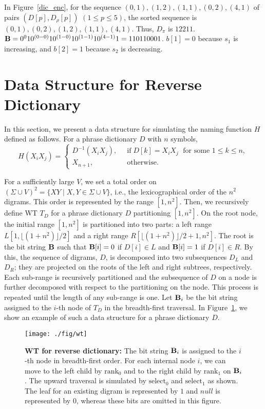 \documentclass[10pt]{llncs}
\begin{document}
In Figure~\ref{dic_enc}, for the sequence $(0,1),(1,2),(1,1),(0,2),(4,1)$ of pairs $(D[p],D_{\rho}[p])$ $(1\leq p \leq 5)$, 
the sorted sequence is $(0,1),(0,2),(1,2),(1,1),(4,1)$.
Thus, $D_\pi$ is $12211$. 
${\bf B}=0^010^{(0-0)}10^{(1-0)}10^{(1-1)}10^{(4-1)}1=110110001$.
$b[1]=0$ because $s_1$ is increasing, and $b[2]=1$ because $s_2$ is decreasing.

\section{Data Structure for Reverse Dictionary}

In this section, we present a data structure for simulating 
the naming function $H$ defined as follows.
For a phrase dictionary $D$ with $n$ symbols,
\[
H(X_iX_j)=\left\{
\begin{array}{ll}
D^{-1}(X_iX_j), & \;\; \mbox{if} \;D[k]=X_iX_j \;\mbox{ for some } 1\leq k\leq n, \\
X_{n+1}, & \;\; \mbox{otherwise.}
\end{array}
\right.
\]

For a sufficiently large $V$, 
we set a total order on $(\Sigma\cup V)^2=\{ XY \mid
X,Y\in \Sigma\cup V\}$, i.e., 
the lexicographical order of the $n^2$ digrams.
This order is represented by the range $[1,n^2]$.
Then, we recursively define WT $T_D$ for a phrase dictionary $D$ 
partitioning $[1,n^2]$.
On the root node, the initial range $[1,n^2]$ is partitioned into two parts: a left range
$L[1,\lfloor(1+n^2)\rfloor/2]$ and a right range $R[\lfloor(1+n^2)\rfloor/2+1,n^2]$.
The root is the bit string ${\bf B}$ such that
${\bf B}[i]=0$ if $D[i]\in L$ and ${\bf B}[i]=1$ if $D[i]\in R$.
By this, the sequence of digrams, $D$, is decomposed into two subsequences $D_L$ and $D_R$;
they are projected on the roots of the left and right subtrees, respectively.
Each sub-range is recursively partitioned and 
the subsequence of $D$ on a node is further decomposed
with respect to the partitioning on the node.
This process is repeated until the length of any sub-range is one.
Let ${\bf B}_i$ be the bit string assigned to the $i$-th node
of $T_D$ in the breadth-first traversal.
In Figure~\ref{wavelet_dic}, we show an example
of such a data structure for a phrase dictionary $D$.

\begin{figure}[tb]
\begin{center}
\texttt{[image: ./fig/wt]}
\end{center}
\caption{
{\bf WT for reverse dictionary:}
The bit string ${\bf B}_i$ is assigned to 
the $i$-th node in breadth-first order.
For each internal node $i$,
we can move to the left child by $\mbox{rank}_0$
and to the right child by $\mbox{rank}_1$ on ${\bf B}_i$.
The upward traversal is simulated by $\mbox{select}_0$
and $\mbox{select}_1$ as shown.
The leaf for an existing digram is represented by $1$
and $null$ is represented by $0$, whereas
these bits are omitted in this figure.
}
\label{wavelet_dic}
\end{figure}
\end{document}
